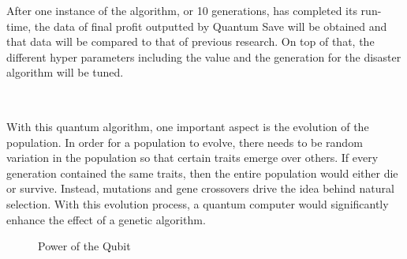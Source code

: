 \vspace{1mm}

After one instance of the algorithm, or 10 generations, has completed its run-time, the data of final profit outputted by Quantum Save will be obtained and that data will be compared to that of previous research. On top of that, the different hyper parameters including the value and the generation for the disaster algorithm will be tuned.

\subsection*{\color{SubSectionBlue}{Why Quantum Computing}}
 \\

With this quantum algorithm, one important aspect is the evolution of the population. In order for a population to evolve, there needs to be random variation in the population so that certain traits emerge over others. If every generation contained the same traits, then the entire population would either die or survive. Instead, mutations and gene crossovers drive the idea behind natural selection. With this evolution process, a quantum computer would significantly enhance the effect of a genetic algorithm. \newpage

\begin{figure}[ht]%
    \centering
    \qquad
    \caption{Power of the Qubit}%
    \label{fig:example}%
\end{figure}
 \\

